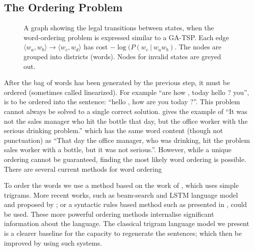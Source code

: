 {\subsection{The Ordering Problem} \label{ordering}
\begin{figure*}
	\begin{center}
	
	\end{center}
	\caption{\label{fig:ordergraph} A graph showing the legal transitions between states, when the word-ordering problem is expressed similar to a GA-TSP. Each edge $\langle w_{a},w_{b}\rangle \to \langle w_{c},w_{d}\rangle$  has cost $-\log(P(w_c\:|\:w_aw_b)$. The nodes are grouped into districts (words). Nodes for invalid states are greyed out.} 
\end{figure*}

After the bag of words has been generated by the previous step, it must be ordered (sometimes called linearized). For example ``are how , today hello ? you'', is to be ordered into the sentence: ``hello , how are you today ?''. This problem cannot always be solved to a single correct solution. \textcite{Mitchell2008}  gives the example of ``It was not the sales manager who hit the bottle that day, but the office worker with the serious drinking problem.'' which has the same word content (though not punctuation) as ``That day the office manager, who was drinking, hit the problem sales worker with a bottle, but it was not serious.''. However, while a unique ordering cannot be guaranteed, finding the most likely word ordering is possible. There are several current methods for word ordering

To order the words we use a method based on the work of \textcite{Horvat2014}, which uses simple trigrams. More recent works, such as beam-search and LSTM language model and proposed by \textcite{2016arXiv160408633S}; or a syntactic rules based method such as presented in \textcite{ZhangWordOrderSyntax}, could be used. These more powerful ordering methods internalise significant information about the language. The classical trigram language model we present is a clearer baseline for the capacity to regenerate the sentences; which then be improved by using such systems.

}
